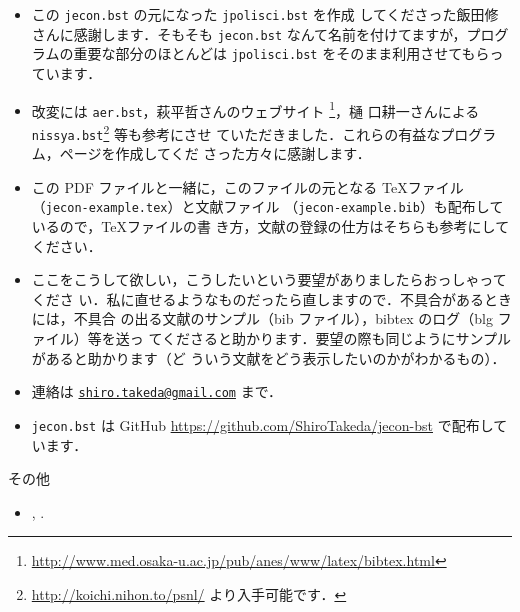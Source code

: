 \documentclass[a4j,10pt]{jarticle}
\begin{document}
\begin{itemize}
 \item この \texttt{jecon.bst} の元になった \texttt{jpolisci.bst} を作成
       してくださった飯田修さんに感謝します．そもそも \texttt{jecon.bst} 
       なんて名前を付けてますが，プログラムの重要な部分のほとんどは
       \texttt{jpolisci.bst} をそのまま利用させてもらっています．
 \item 改変には \texttt{aer.bst}，萩平哲さんのウェブサイト
       \footnote{
       \url{http://www.med.osaka-u.ac.jp/pub/anes/www/latex/bibtex.html}}，樋
       口耕一さんによる \texttt{nissya.bst}\footnote{
       \url{http://koichi.nihon.to/psnl/} より入手可能です．} 等も参考にさせ
       ていただきました．これらの有益なプログラム，ページを作成してくだ
       さった方々に感謝します．
 \item この PDF ファイルと一緒に，このファイルの元となる \TeX ファイル 
      （\texttt{jecon-example.tex}）と文献ファイル 
      （\texttt{jecon-example.bib}）も配布しているので，\TeX ファイルの書
       き方，文献の登録の仕方はそちらも参考にしてください．
 \item ここをこうして欲しい，こうしたいという要望がありましたらおっしゃってくださ
       い．私に直せるようなものだったら直しますので．不具合があるときには，不具合
       の出る文献のサンプル（bib ファイル），bibtex のログ（blg ファイル）等を送っ
       てくださると助かります．要望の際も同じようにサンプルがあると助かります（ど
       ういう文献をどう表示したいのかがわかるもの）．
 \item 連絡は \texttt{\href{mailto:shiro.takeda@gmail.com}{shiro.takeda@gmail.com}} まで．
 \item \texttt{jecon.bst} は GitHub
       \url{https://github.com/ShiroTakeda/jecon-bst} で配布しています．
\end{itemize}

\nocite{*}

その他
\begin{itemize}
 \item \citet{zhang2016Deep}, \citet{imbens2019Optimized}.
\end{itemize}


% 
% 

%

% 
\end{document}
